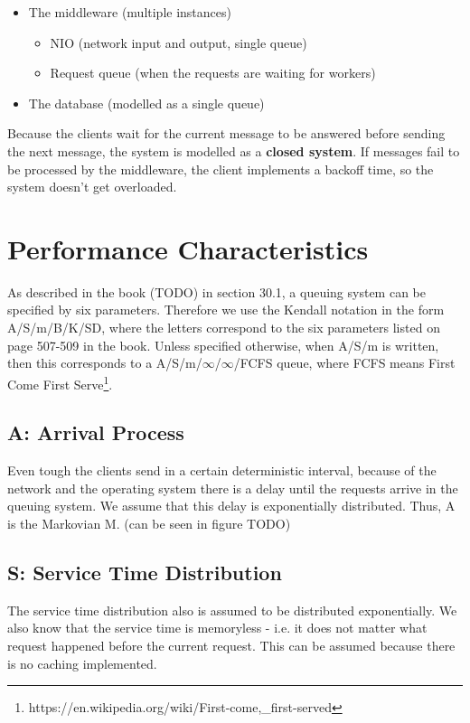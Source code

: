 \documentclass[a4paper]{article}
\begin{document}
{\begin{itemize}
\item The middleware (multiple instances)
	\begin{itemize}
	\item NIO (network input and output, single queue)
	\item Request queue (when the requests are waiting for workers)
	\end{itemize}
\item The database (modelled as a single queue)
\end{itemize}

Because the clients wait for the current message to be answered before sending the next message, the system is modelled as a \textbf{closed system}. If messages fail to be processed by the middleware, the client implements a backoff time, so the system doesn't get overloaded.

\section{Performance Characteristics}

As described in the book (TODO) in section 30.1, a queuing system can be specified by six parameters. Therefore we use the Kendall notation in the form A/S/m/B/K/SD, where the letters correspond to the six parameters listed on page 507-509 in the book. Unless specified otherwise, when A/S/m is written, then this corresponds to a A/S/m/$\infty$/$\infty$/FCFS queue, where FCFS means First Come First Serve\footnote{https://en.wikipedia.org/wiki/First-come,\_first-served}.

\subsection{A: Arrival Process}

Even tough the clients send in a certain deterministic interval, because of the network and the operating system there is a delay until the requests arrive in the queuing system. We assume that this delay is exponentially distributed. Thus, A is the Markovian M. (can be seen in figure TODO)

\subsection{S: Service Time Distribution}

The service time distribution also is assumed to be distributed exponentially. We also know that the service time is memoryless - i.e. it does not matter what request happened before the current request. This can be assumed because there is no caching implemented.

}
\end{document}
